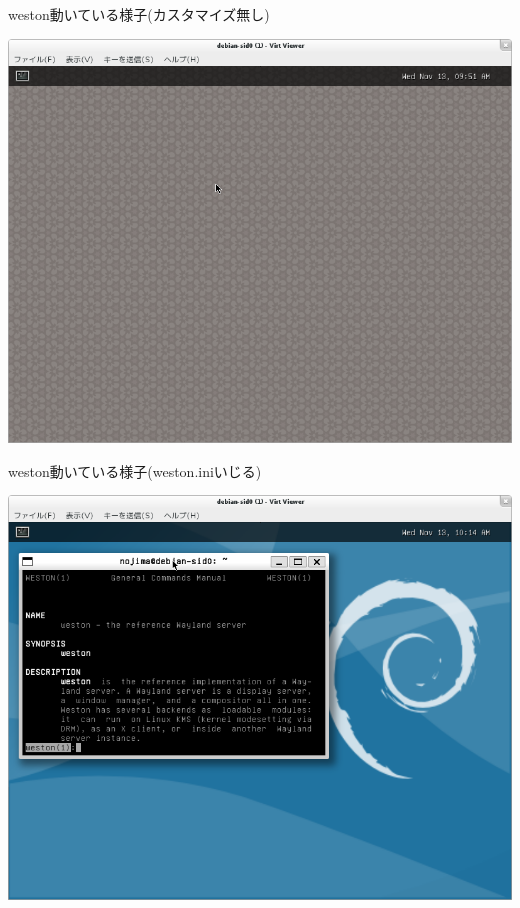 \begin{frame}{weston動いている様子(カスタマイズ無し)}
\begin{center}
\includegraphics[width=0.8\hsize]{image201311/weston-1st-launch.png}
\end{center}
\end{frame}

\begin{frame}{weston動いている様子(weston.iniいじる)}
\begin{center}
\includegraphics[width=0.8\hsize]{image201311/weston-2nd-launch.png}
\end{center}
\end{frame}

